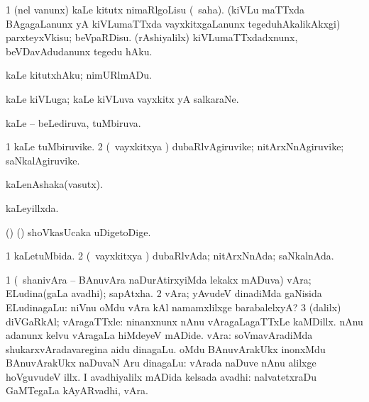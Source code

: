{{\bentry
{} 
\gl{\sakirx}
\expl{}
\bmng
\bnum
\num{1} (nel \mo vanunx) kaLe kitutx nimaRlgoLisu (\rUpa\ saha). 
\banum
{} (kiVLu maTTxda BAgagaLanunx yA kiVLumaTTxda vayxkitxgaLanunx tegeduhAkalikAkxgi) parxteyxVkisu; beVpaRDisu. 
 (rAshiyalilx) kiVLumaTTxdadxnunx, beVDavAdudanunx tegedu hAku. 
\eanum
\numie
\enum
\emng

\noindent 
\gl{\akirx}
\expl{}
\bmng
kaLe kitutxhAku; nimURlmADu. 
\emng
\eentry

\bentry
{} 
\gl{\nA}
\expl{}
\bmng
kaLe kiVLuga; kaLe kiVLuva vayxkitx yA salkaraNe. 
\emng
\eentry

\bentry
{} 
\gl{\gu}
\expl{}
\bmng
kaLe -- beLediruva, tuMbiruva. 
\emng
\eentry

\bentry
{} 
\gl{\nA}
\expl{}
\bmng
\bnum
\num{1} kaLe tuMbiruvike. 
\num{2} (\kanmu\ vayxkitxya \vi) dubaRlvAgiruvike; nitArxNnAgiruvike; saNkalAgiruvike. 
\enum
\emng
\eentry

\bentry
{} 
\gl{\nA}
\expl{}
\bmng
kaLenAshaka(vasutx). 
\emng
\eentry

\bentry
{} 
\gl{\gu}
\expl{}
\bmng
kaLeyillxda. 
\emng
\eentry

\bentry
{} 
\gl{\nA}
\expl{}
\bmng
(\bava) (\pArxparx) shoVkasUcaka uDigetoDige. 
\emng
\eentry

\bentry
{} 
\gl{\gu}
\bmng
\bnum
\num{1} kaLetuMbida. 
\num{2} (\kanmu\ vayxkitxya \vi) dubaRlvAda; nitArxNnAda; saNkalnAda. 
\enum
\emng
\eentry

\bentry
{} 
\gl{\nA}
\expl{}
\bmng
\bnum
\num{1} (\sA\ shanivAra -- BAnuvAra naDurAtirxyiMda lekakx mADuva) vAra; ELudina(gaLa avadhi); sapAtxha. 
\num{2} vAra; yAvudeV dinadiMda gaNisida ELudinagaLu:  niVnu oMdu vAra kAl namamxlilxge barabalelxyA? 
\num{3} (\bava dalilx) diVGaRkAl; vAragaTTxle:  ninanxnunx nAnu vAragaLagaTTxLe kaMDillx.  nAnu adanunx kelvu vAragaLa hiMdeyeV mADide. 
 vAra: 
\banum
{} soVmavAradiMda shukarxvAradavaregina aidu dinagaLu. 
 oMdu BAnuvArakUkx inonxMdu BAnuvArakUkx naDuvaN Aru dinagaLu:  vArada naDuve nAnu alilxge hoVguvudeV illx. 
 I avadhiyalilx mADida kelsada avadhi:  nalvatetxraDu GaMTegaLa kAyARvadhi, vAra. 
\eanum
\numie
\enum
\emng

}}
